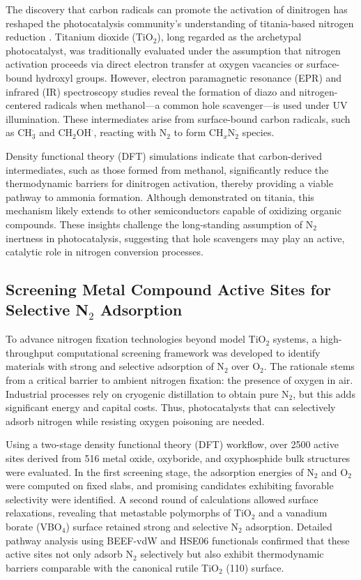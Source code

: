 The discovery that carbon radicals can promote the activation of dinitrogen has reshaped the photocatalysis community's understanding of titania-based nitrogen reduction \cite{comer2018role, Huang2023FormationIllumination}. Titanium dioxide (TiO$_2$), long regarded as the archetypal photocatalyst, was traditionally evaluated under the assumption that nitrogen activation proceeds via direct electron transfer at oxygen vacancies or surface-bound hydroxyl groups. However, electron paramagnetic resonance (EPR) and infrared (IR) spectroscopy studies reveal the formation of diazo and nitrogen-centered radicals when methanol—a common hole scavenger—is used under UV illumination. These intermediates arise from surface-bound carbon radicals, such as CH$_3^\cdot$ and CH$_2$OH$^\cdot$, reacting with N$_2$ to form CH$_x$N$_2^\cdot$ species.

Density functional theory (DFT) simulations indicate that carbon-derived intermediates, such as those formed from methanol, significantly reduce the thermodynamic barriers for dinitrogen activation, thereby providing a viable pathway to ammonia formation. Although demonstrated on titania, this mechanism likely extends to other semiconductors capable of oxidizing organic compounds. These insights challenge the long-standing assumption of N$_2$ inertness in photocatalysis, suggesting that hole scavengers may play an active, catalytic role in nitrogen conversion processes.

\subsection{Screening Metal Compound Active Sites for Selective N$_2$ Adsorption}

To advance nitrogen fixation technologies beyond model TiO$_2$ systems, a high-throughput computational screening framework was developed to identify materials with strong and selective adsorption of N$_2$ over O$_2$. The rationale stems from a critical barrier to ambient nitrogen fixation: the presence of oxygen in air. Industrial processes rely on cryogenic distillation to obtain pure N$_2$, but this adds significant energy and capital costs. Thus, photocatalysts that can selectively adsorb nitrogen while resisting oxygen poisoning are needed.

Using a two-stage density functional theory (DFT) workflow, over 2500 active sites derived from 516 metal oxide, oxyboride, and oxyphosphide bulk structures were evaluated. In the first screening stage, the adsorption energies of N$_2$ and O$_2$ were computed on fixed slabs, and promising candidates exhibiting favorable selectivity were identified. A second round of calculations allowed surface relaxations, revealing that metastable polymorphs of TiO$_2$ and a vanadium borate (VBO$_4$) surface retained strong and selective N$_2$ adsorption. Detailed pathway analysis using BEEF-vdW and HSE06 functionals confirmed that these active sites not only adsorb N$_2$ selectively but also exhibit thermodynamic barriers comparable with the canonical rutile TiO$_2$ (110) surface.

